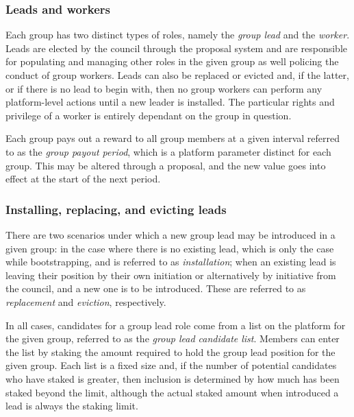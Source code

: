 \documentclass{article}
\begin{document}
\subsubsection{Leads and workers}

Each group has two distinct types of roles, namely the \textit{group lead} and the \textit{worker}. Leads are elected by the council through the proposal system and are responsible for populating and managing other roles in the given group as well policing the conduct of group workers. Leads can also be replaced or evicted and, if the latter, or if there is no lead to begin with, then no group workers can perform any platform-level actions until a new leader is installed. The particular rights and privilege of a worker is entirely dependant on the group in question.

Each group pays out a reward to all group members at a given interval referred to as the \textit{group payout period}, which is a platform parameter distinct for each group. This may be altered through a proposal, and the new value goes into effect at the start of the next period.

\subsubsection{Installing, replacing, and evicting leads}

There are two scenarios under which a new group lead may be introduced in a given group: in the case where there is no existing lead, which is only the case while bootstrapping, and is referred to as \textit{installation}; when an existing lead is leaving their position by their own initiation or alternatively by initiative from the council, and a new one is to be introduced. These are referred to as \textit{replacement} and \textit{eviction}, respectively.

In all cases, candidates for a group lead role come from a list on the platform for the given group, referred to as the \textit{group lead candidate list}. Members can enter the list by staking the amount required to hold the group lead position for the given group. Each list is a fixed size and, if the number of potential candidates who have staked is greater, then inclusion is determined by how much has been staked beyond the limit, although the actual staked amount when introduced a lead is always the staking limit.

\end{document}
